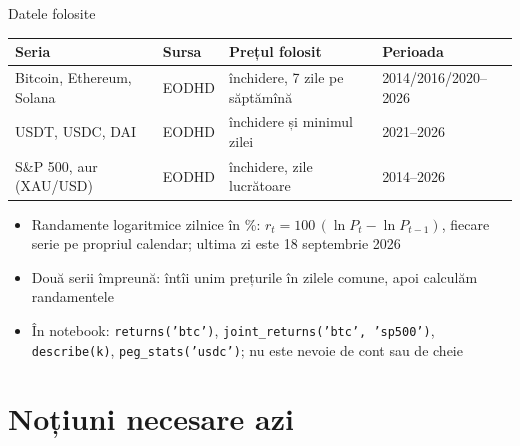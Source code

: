 \begin{frame}{Datele folosite}
\itemsize{\small}
\begin{center}
\footnotesize
\begin{tabular}{llll}
\toprule
\textbf{Seria} & \textbf{Sursa} & \textbf{Prețul folosit} & \textbf{Perioada} \\
\midrule
Bitcoin, Ethereum, Solana & EODHD & închidere, 7 zile pe săptămînă & 2014/2016/2020--2026 \\
USDT, USDC, DAI & EODHD & închidere și minimul zilei & 2021--2026 \\
S\&P 500, aur (XAU/USD) & EODHD & închidere, zile lucrătoare & 2014--2026 \\
\bottomrule
\end{tabular}
\end{center}
\begin{itemize}
    \item Randamente logaritmice zilnice în \%: $r_t = 100\,(\ln P_t - \ln P_{t-1})$, fiecare serie pe propriul calendar; ultima zi este 18 septembrie 2026
    \item Două serii împreună: întîi unim prețurile în zilele comune, apoi calculăm randamentele
    \item În notebook: \texttt{returns('btc')}, \texttt{joint\_returns('btc', 'sp500')}, \texttt{describe(k)}, \texttt{peg\_stats('usdc')}; nu este nevoie de cont sau de cheie
\end{itemize}
\end{frame}


\section{Noțiuni necesare azi}

